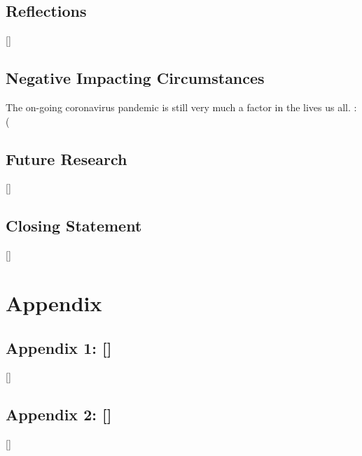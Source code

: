 \documentclass{article}
\begin{document}
    \subsection{Reflections}
        []
    \subsection{Negative Impacting Circumstances}
        The on-going coronavirus pandemic is still very much a factor in the lives us all. :(
    \subsection{Future Research}
        []
    \subsection{Closing Statement}
        []

\newpage
\section*{Appendix}
    \subsection*{Appendix 1: []}
        []
    \subsection*{Appendix 2: []}
        []
\end{document}
